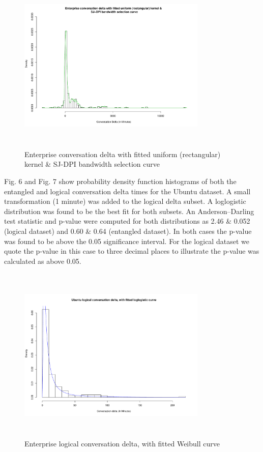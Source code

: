 \documentclass[conference]{IEEEtran}
\begin{document}
\begin{figure}
\begin{center}
\includegraphics[height=8.5cm, width=9cm]{05_delta_kde_enterprise.pdf} 
\caption{Enterprise conversation delta with fitted uniform (rectangular) kernel & \n SJ-DPI bandwidth selection curve}
\end{center}
\label{fig:delta_kde_ent}
\end{figure}

Fig. 6 and Fig. 7 show probability density function histograms of both the entangled and logical conversation delta times for the Ubuntu dataset. A small transformation (1 minute) was added to the logical delta subset. A loglogistic distribution was found to be the best fit for both subsets.  An Anderson--Darling test statistic and p-value were computed for both distributions as 2.46 \& 0.052 (logical dataset) and 0.60 \&  0.64 (entangled dataset). In both cases the p-value was found to be above the 0.05 significance interval. For the logical dataset we quote the p-value in this case to three decimal places to illustrate the p-value was calculated as above 0.05.

\begin{figure}
\begin{center}
\includegraphics[height=8.5cm, width=9cm]{06_delta_logical_ubuntu.pdf} 
\caption{Enterprise logical conversation delta, with fitted Weibull curve}
\end{center}
\label{fig:delta_log_ubun}
\end{figure}
\end{document}
